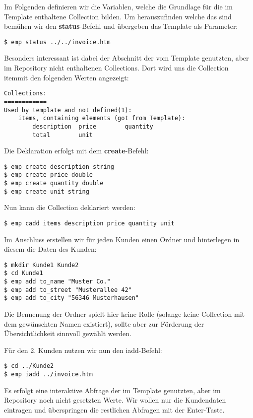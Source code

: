 Im Folgenden definieren wir die Variablen, welche die Grundlage für die im Template enthaltene Collection bilden. Um herauszufinden welche das sind bemühen wir den \textbf{status}-Befehl und übergeben das Template als Parameter:
\begin{lstlisting}[style=Bash]
$ emp status ../../invoice.htm
\end{lstlisting}

Besonders interessant ist dabei der Abschnitt der vom Template genutzten, aber im Repository nicht enthaltenen Collections. Dort wird uns die Collection \grqq item\grqq mit den folgenden Werten angezeigt:

\begin{lstlisting}[style=Bash]
Collections:
============
Used by template and not defined(1):
	items, containing elements (got from Template):
		description  price        quantity
		total        unit
\end{lstlisting}

Die Deklaration erfolgt mit dem \textbf{create}-Befehl:
\begin{lstlisting}[style=Bash]
$ emp create description string
$ emp create price double
$ emp create quantity double
$ emp create unit string
\end{lstlisting}

Nun kann die Collection deklariert werden:

\begin{lstlisting}[style=Bash]
$ emp cadd items description price quantity unit
\end{lstlisting}

Im Anschluss erstellen wir für jeden Kunden einen Ordner und hinterlegen in diesem die Daten des Kunden:
\begin{lstlisting}[style=Bash]
$ mkdir Kunde1 Kunde2
$ cd Kunde1
$ emp add to_name "Muster Co."
$ emp add to_street "Musterallee 42"
$ emp add to_city "56346 Musterhausen"
\end{lstlisting}

Die Bennenung der Ordner spielt hier keine Rolle (solange keine Collection mit dem gewünschten Namen existiert), sollte aber zur Förderung der Übersichtlichkeit sinnvoll gewählt werden.

Für den 2. Kunden nutzen wir nun den iadd-Befehl:
\begin{lstlisting}[style=Bash]
$ cd ../Kunde2
$ emp iadd ../invoice.htm
\end{lstlisting}

Es erfolgt eine interaktive Abfrage der im Template genutzten, aber im Repository noch nicht gesetzten Werte. Wir wollen nur die Kundendaten eintragen und überspringen die restlichen Abfragen mit der Enter-Taste.

